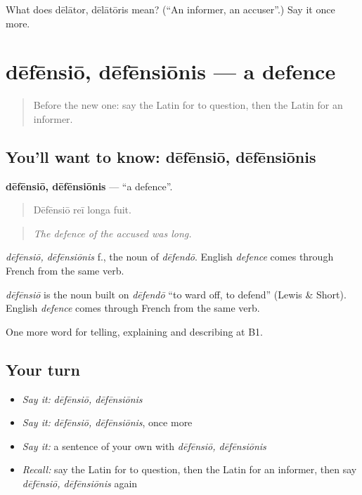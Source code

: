 \begin{tcolorbox}[breakable,colback=teal!4,colframe=teal!35!black,title={Before you move on}]
What does dēlātor, dēlātōris mean? (\textquotedblleft{}An informer, an accuser\textquotedblright{}.) Say it once more.
\end{tcolorbox}
\section[dēfēnsiō, dēfēnsiōnis]{dēfēnsiō, dēfēnsiōnis — a defence}

\label{lesson:LA-C412-defensio}



\begin{quote}
Before the new one: say the Latin for to question, then the Latin for an informer.
\end{quote}

\subsection*{You'll want to know: dēfēnsiō, dēfēnsiōnis}
\textbf{dēfēnsiō, dēfēnsiōnis} — \textquotedblleft{}a defence\textquotedblright{}.

\begin{quote}
Dēfēnsiō reī longa fuit.
\end{quote}

\begin{quote}
\emph{The defence of the accused was long.}
\end{quote}

\emph{dēfēnsiō, dēfēnsiōnis} f., the noun of \emph{dēfendō}. English \emph{defence} comes through French from the same verb.

\begin{cousinweb}
\emph{dēfēnsiō} is the noun built on \emph{dēfendō} \textquotedblleft{}to ward off, to defend\textquotedblright{} (Lewis \& Short). English \emph{defence} comes through French from the same verb.
\end{cousinweb}

\begin{grammarlens}[title={What you've built}]
One more word for telling, explaining and describing at B1.
\end{grammarlens}

\subsection*{Your turn}
\begin{itemize}
\raggedright
  \item \emph{Say it:} \emph{dēfēnsiō, dēfēnsiōnis}
  \item \emph{Say it:} \emph{dēfēnsiō, dēfēnsiōnis}, once more
  \item \emph{Say it:} a sentence of your own with \emph{dēfēnsiō, dēfēnsiōnis}
  \item \emph{Recall:} say the Latin for to question, then the Latin for an informer, then say \emph{dēfēnsiō, dēfēnsiōnis} again
\end{itemize}

